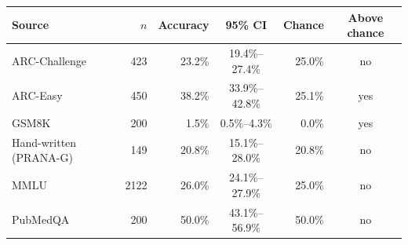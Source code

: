 \begin{tabular}{lrrcrc}
\toprule
Source & $n$ & Accuracy & 95\% CI & Chance & Above chance \\
\midrule
ARC-Challenge & 423 & 23.2\% & 19.4\%--27.4\% & 25.0\% & no \\
ARC-Easy & 450 & 38.2\% & 33.9\%--42.8\% & 25.1\% & yes \\
GSM8K & 200 & 1.5\% & 0.5\%--4.3\% & 0.0\% & yes \\
Hand-written (PRANA-G) & 149 & 20.8\% & 15.1\%--28.0\% & 20.8\% & no \\
MMLU & 2122 & 26.0\% & 24.1\%--27.9\% & 25.0\% & no \\
PubMedQA & 200 & 50.0\% & 43.1\%--56.9\% & 50.0\% & no \\
\bottomrule
\end{tabular}

